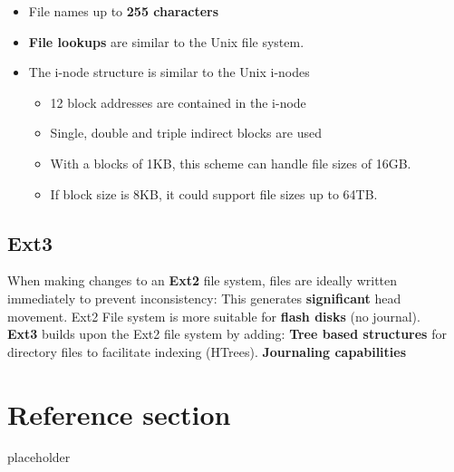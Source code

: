 \documentclass{article}
\begin{document}
\begin{itemize}
	\item File names up to \textbf{255 characters}
	\item \textbf{File lookups} are similar to the Unix file system.
	\item The i-node structure is similar to the Unix i-nodes
	\begin{itemize}
		\item 12 block addresses are contained in the i-node
		\item Single, double and triple indirect blocks are used
		\item With a blocks of 1KB, this scheme can handle file sizes of 16GB.
		\item If block size is 8KB, it could support file sizes up to 64TB.
	\end{itemize}
\end{itemize}

\subsection{Ext3}
\begin{flushleft}
When making changes to an \textbf{Ext2} file system, files are ideally written immediately to prevent inconsistency: This generates \textbf{significant} head movement. Ext2 File system is more suitable for \textbf{flash disks} (no journal).\\
\textbf{Ext3} builds upon the Ext2 file system by adding: \textbf{Tree based structures} for directory files to facilitate indexing (HTrees). \textbf{Journaling capabilities}
\end{flushleft}

\pagebreak
\section*{Reference section} \label{sec:reference}
\begin{description}
	\item[placeholder] \hfill \\
\end{description}
\end{document}
